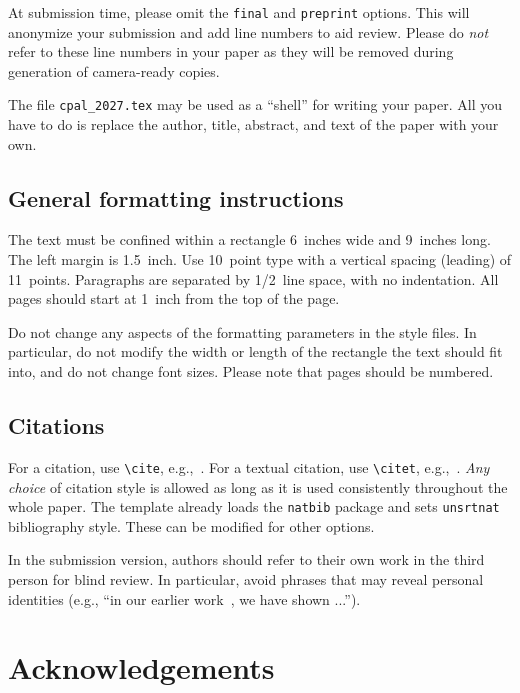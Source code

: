 \documentclass{article}
\begin{document}
At submission time, please omit the \verb+final+ and \verb+preprint+
options. This will anonymize your submission and add line numbers to aid
review. Please do \emph{not} refer to these line numbers in your paper as they
will be removed during generation of camera-ready copies.


The file \verb+cpal_2027.tex+ may be used as a ``shell'' for writing your
paper. All you have to do is replace the author, title, abstract, and text of
the paper with your own.

\subsection{General formatting instructions}
\label{gen_inst}


The text must be confined within a rectangle 6~inches wide and
9~inches long. The left margin is 1.5~inch.  Use 10~point
type with a vertical spacing (leading) of 11~points. 
Paragraphs are separated by 1/2~line space, with no
indentation. All pages should start at 1~inch  from the
top of the page.


Do not change any aspects of the formatting parameters in the style files.  In
particular, do not modify the width or length of the rectangle the text should
fit into, and do not change font sizes. Please note that pages should be
numbered.






\subsection{Citations}
\label{others}

For a citation, use \verb+\cite+, e.g.,~\cite{ma2022principles}.
For a textual citation, use \verb+\citet+, e.g.,~\citet{ma2022principles}.  \emph{Any choice} of citation style is allowed as long as it is used consistently throughout the whole paper. The template already loads the \verb+natbib+ package and sets \verb+unsrtnat+ bibliography style. These can be modified for other options.


In the submission version, authors should refer to their own work in the third person for blind review.
In particular, avoid phrases that may reveal personal identities (e.g., ``in our earlier work~\cite{ma2022principles}, we have shown ...''). 


\section*{Acknowledgements}
\end{document}
